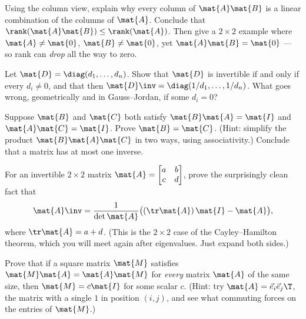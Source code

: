 \begin{exercise}
Using the column view, explain why every column of $\mat{A}\mat{B}$ is a linear
combination of the columns of $\mat{A}$. Conclude that $\rank(\mat{A}\mat{B}) \le
\rank(\mat{A})$. Then give a $2\times2$ example where $\mat{A}\ne\mat{0}$, $\mat{B}\ne
\mat{0}$, yet $\mat{A}\mat{B} = \mat{0}$ --- so rank can \emph{drop} all the way to zero.
\end{exercise}

\begin{exercise}
Let $\mat{D} = \diag(d_1,\dots,d_n)$. Show that $\mat{D}$ is invertible if and only if
every $d_i \ne 0$, and that then $\mat{D}\inv = \diag(1/d_1,\dots,1/d_n)$. What goes
wrong, geometrically and in Gauss--Jordan, if some $d_i = 0$?
\end{exercise}

\begin{exercise}
Suppose $\mat{B}$ and $\mat{C}$ both satisfy $\mat{B}\mat{A} = \mat{I}$ and
$\mat{A}\mat{C} = \mat{I}$. Prove $\mat{B} = \mat{C}$. (Hint: simplify the product
$\mat{B}\mat{A}\mat{C}$ in two ways, using associativity.) Conclude that a matrix has at
most one inverse.
\end{exercise}

\begin{exercise}
For an invertible $2\times2$ matrix $\mat{A} = \begin{bmatrix} a & b \\ c & d \end{bmatrix}$, prove the surprisingly clean fact that
\[
\mat{A}\inv = \frac{1}{\det\mat{A}}\bigl((\tr\mat{A})\,\mat{I} - \mat{A}\bigr),
\]
where $\tr\mat{A} = a + d$. (This is the $2\times2$ case of the Cayley--Hamilton
theorem, which you will meet again after eigenvalues. Just expand both sides.)
\end{exercise}

\begin{exercise}
Prove that if a square matrix $\mat{M}$ satisfies $\mat{M}\mat{A} = \mat{A}\mat{M}$ for
\emph{every} matrix $\mat{A}$ of the same size, then $\mat{M} = c\mat{I}$ for some scalar
$c$. (Hint: try $\mat{A} = \vec{e}_i\vec{e}_j\T$, the matrix with a single $1$ in
position $(i,j)$, and see what commuting forces on the entries of $\mat{M}$.)
\end{exercise}
